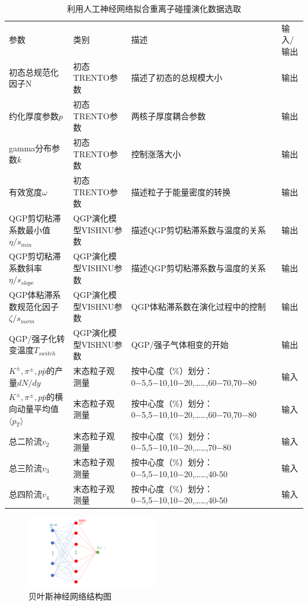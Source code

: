 \documentclass[aps,pre,12pt,preprint,onecolumn,showpacs,showkeys]{revtex4-1}
\begin{document}
\begin{table}[htbp]
\caption{利用人工神经网络拟合重离子碰撞演化数据选取\label{tab:bnn}}
\begin{ruledtabular}
\begin{tabular}{p{4cm}p{4cm}p{4cm}p{4cm}}
参数&类别&描述&输入/输出\\
\colrule
初态总规范化因子$\mathrm{N}$&初态TRENTO参数&描述了初态的总规模大小&输出\\
约化厚度参数$p$&初态TRENTO参数&两核子厚度耦合参数&输出\\
gamma分布参数$k$&初态TRENTO参数&控制涨落大小&输出\\
有效宽度$\omega$&初态TRENTO参数&描述粒子于能量密度的转换&输出\\
\colrule
QGP剪切粘滞系数最小值$\eta/s_{min}$&QGP演化模型VISHNU参数&描述QGP剪切粘滞系数与温度的关系&输出\\
QGP剪切粘滞系数斜率$\eta/s_{slope}$&QGP演化模型VISHNU参数&描述QGP剪切粘滞系数与温度的关系&输出\\
QGP体粘滞系数规范化因子$\zeta/s_{norm}$&QGP演化模型VISHNU参数&QGP体粘滞系数在演化过程中的控制&输出\\
QGP/强子化转变温度$T_{switch}$&QGP演化模型VISHNU参数&QGP/强子气体相变的开始&输出\\
\colrule
$K^{\pm},\pi^{\pm},p\bar{p}$的产量$dN/dy$&末态粒子观测量&按中心度（\%）划分：0−5,5−10,10−20,……,60−70,70−80&输入\\
$K^{\pm},\pi^{\pm},p\bar{p}$的横向动量平均值$\langle p_{T}\rangle$&末态粒子观测量&按中心度（\%）划分：0−5,5−10,10−20,……,60−70,70−80&输入\\
总二阶流$v_2$&末态粒子观测量&按中心度（\%）划分：0−5,5−10,10−20,……,70−80&输入\\
总三阶流$v_3$&末态粒子观测量&按中心度（\%）划分：0−5,5−10,10−20,……,40-50&输入\\
总四阶流$v_4$&末态粒子观测量&按中心度（\%）划分：0−5,5−10,10−20,……,40-50&输入\\
\end{tabular}
\end{ruledtabular}
\end{table}
\begin{figure}[htbp]
\centering
\includegraphics[width=0.5\textwidth]{bnn}
\caption{贝叶斯神经网络结构图\label{fig:bnn}}%
\end{figure}
\end{document}

